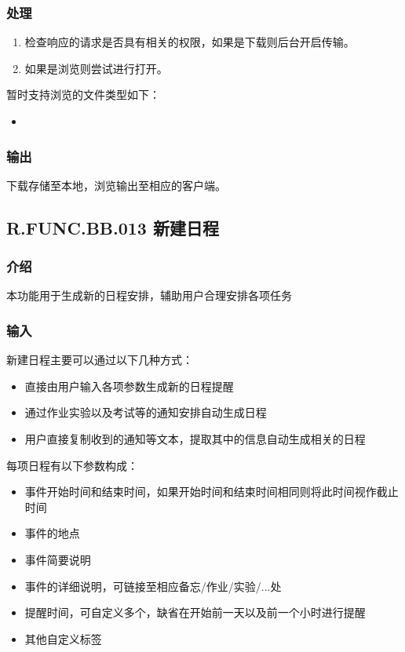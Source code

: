     \subsubsection{处理}
    \begin{enumerate}
      \item 检查响应的请求是否具有相关的权限，如果是下载则后台开启传输。
      \item 如果是浏览则尝试进行打开。
    \end{enumerate}
    暂时支持浏览的文件类型如下：
    \begin{itemize}
      \item
    \end{itemize}
    \subsubsection{输出}
    下载存储至本地，浏览输出至相应的客户端。

  \subsection{R.FUNC.BB.013 新建日程}
    \subsubsection{介绍}
    本功能用于生成新的日程安排，辅助用户合理安排各项任务
    \subsubsection{输入}
    新建日程主要可以通过以下几种方式：
    \begin{itemize}
      \item 直接由用户输入各项参数生成新的日程提醒
      \item 通过作业实验以及考试等的通知安排自动生成日程
      \item 用户直接复制收到的通知等文本，提取其中的信息自动生成相关的日程
    \end{itemize}
    每项日程有以下参数构成：
    \begin{itemize}
      \item 事件开始时间和结束时间，如果开始时间和结束时间相同则将此时间视作截止时间
      \item 事件的地点
      \item 事件简要说明
      \item 事件的详细说明，可链接至相应备忘/作业/实验/...处
      \item 提醒时间，可自定义多个，缺省在开始前一天以及前一个小时进行提醒
      \item 其他自定义标签
    \end{itemize}
